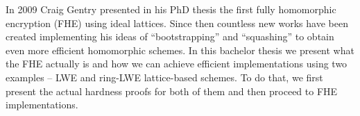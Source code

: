 In 2009 Craig Gentry presented in his PhD thesis the first fully homomorphic encryption (FHE) using ideal lattices. Since then countless new works have been created implementing his ideas of  ``bootstrapping'' and ``squashing'' to obtain even more efficient homomorphic schemes. In this bachelor thesis we present what the FHE actually is and how we can achieve efficient implementations using two examples -- LWE and ring-LWE lattice-based schemes. To do that, we first present the actual hardness proofs for both of them and then proceed to FHE implementations.
